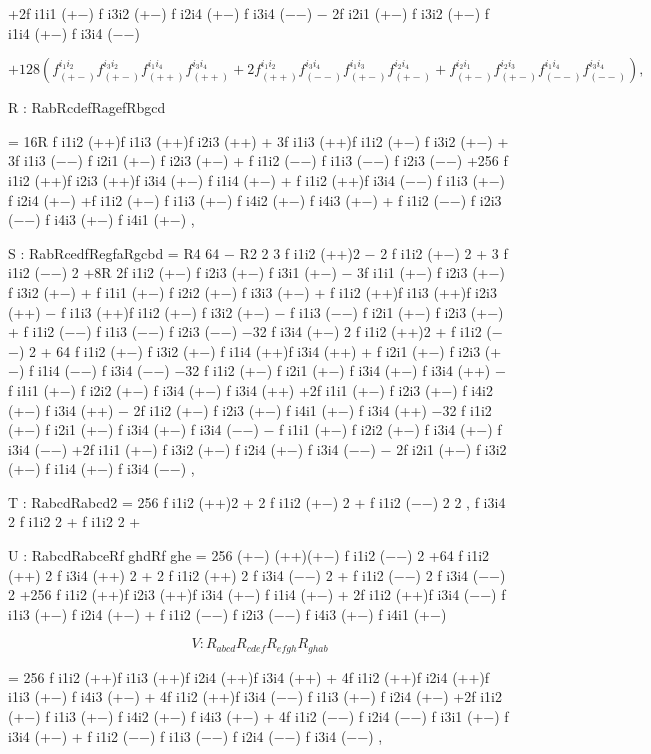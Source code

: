 \documentclass{article}
\begin{document}
+2f i1i1 (+−) f i3i2 (+−) f i2i4 (+−) f i3i4 (−−) − 2f i2i1 (+−) f i3i2 (+−) f i1i4 (+−) f i3i4 (−−)

$$+128\left(f_{(+-)}^{i_{1}i_{2}}f_{(+-)}^{i_{3}i_{2}}f_{(++)}^{i_{1}i_{4}}f_{(++)}^{i_{3}i_{4}}+2f_{(++)}^{i_{1}i_{2}}f_{(--)}^{i_{3}i_{4}}f_{(+-)}^{i_{1}i_{3}}f_{(+-)}^{i_{2}i_{4}}+f_{(+-)}^{i_{2}i_{1}}f_{(+-)}^{i_{2}i_{3}}f_{(--)}^{i_{1}i_{4}}f_{(--)}^{i_{3}i_{4}}\right),$$

R : RabRcdefRagefRbgcd

= 16R f i1i2 (++)f i1i3 (++)f i2i3 (++) + 3f i1i3 (++)f i1i2 (+−) f i3i2 (+−) + 3f i1i3 (−−) f i2i1 (+−) f i2i3 (+−) + f i1i2 (−−) f i1i3 (−−) f i2i3 (−−) +256 f i1i2 (++)f i2i3 (++)f i3i4 (+−) f i1i4 (+−) + f i1i2 (++)f i3i4 (−−) f i1i3 (+−) f i2i4 (+−) +f i1i2 (+−) f i1i3 (+−) f i4i2 (+−) f i4i3 (+−) + f i1i2 (−−) f i2i3 (−−) f i4i3 (+−) f i4i1 (+−) ,

S : RabRcedfRegfaRgcbd = R4 64 − R2 2 3 f i1i2 (++)2 − 2 f i1i2 (+−) 2 + 3 f i1i2 (−−) 2 +8R 2f i1i2 (+−) f i2i3 (+−) f i3i1 (+−) − 3f i1i1 (+−) f i2i3 (+−) f i3i2 (+−) + f i1i1 (+−) f i2i2 (+−) f i3i3 (+−) + f i1i2 (++)f i1i3 (++)f i2i3 (++) − f i1i3 (++)f i1i2 (+−) f i3i2 (+−) − f i1i3 (−−) f i2i1 (+−) f i2i3 (+−) + f i1i2 (−−) f i1i3 (−−) f i2i3 (−−) −32 f i3i4 (+−) 2 f i1i2 (++)2 + f i1i2 (−−) 2 + 64 f i1i2 (+−) f i3i2 (+−) f i1i4 (++)f i3i4 (++) + f i2i1 (+−) f i2i3 (+−) f i1i4 (−−) f i3i4 (−−) −32 f i1i2 (+−) f i2i1 (+−) f i3i4 (+−) f i3i4 (++) − f i1i1 (+−) f i2i2 (+−) f i3i4 (+−) f i3i4 (++) +2f i1i1 (+−) f i2i3 (+−) f i4i2 (+−) f i3i4 (++) − 2f i1i2 (+−) f i2i3 (+−) f i4i1 (+−) f i3i4 (++) −32 f i1i2 (+−) f i2i1 (+−) f i3i4 (+−) f i3i4 (−−) − f i1i1 (+−) f i2i2 (+−) f i3i4 (+−) f i3i4 (−−) +2f i1i1 (+−) f i3i2 (+−) f i2i4 (+−) f i3i4 (−−) − 2f i2i1 (+−) f i3i2 (+−) f i1i4 (+−) f i3i4 (−−) ,

T : RabcdRabcd2 = 256 f i1i2 (++)2 + 2 f i1i2 (+−) 2 + f i1i2 (−−) 2 2 , f i3i4 2 f i1i2 2 + f i1i2 2 +

U : RabcdRabceRf ghdRf ghe = 256 (+−) (++)(+−) f i1i2 (−−) 2 +64 f i1i2 (++) 2 f i3i4 (++) 2 + 2 f i1i2 (++) 2 f i3i4 (−−) 2 + f i1i2 (−−) 2 f i3i4 (−−) 2 +256 f i1i2 (++)f i2i3 (++)f i3i4 (+−) f i1i4 (+−) + 2f i1i2 (++)f i3i4 (−−) f i1i3 (+−) f i2i4 (+−) + f i1i2 (−−) f i2i3 (−−) f i4i3 (+−) f i4i1 (+−)

$$V:R_{a b c d}R_{c d e f}R_{e f g h}R_{g h a b}$$

= 256 f i1i2 (++)f i1i3 (++)f i2i4 (++)f i3i4 (++) + 4f i1i2 (++)f i2i4 (++)f i1i3 (+−) f i4i3 (+−) + 4f i1i2 (++)f i3i4 (−−) f i1i3 (+−) f i2i4 (+−) +2f i1i2 (+−) f i1i3 (+−) f i4i2 (+−) f i4i3 (+−) + 4f i1i2 (−−) f i2i4 (−−) f i3i1 (+−) f i3i4 (+−) + f i1i2 (−−) f i1i3 (−−) f i2i4 (−−) f i3i4 (−−) ,
\end{document}

